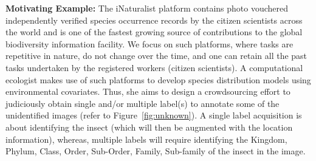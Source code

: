 

%
\begin{example}\label{ex1}
{\bf Motivating Example:} 
The iNaturalist platform contains photo vouchered independently verified species occurrence records by the citizen scientists across the world and is one of the fastest growing source of contributions to the global biodiversity information facility. We focus on such platforms, where tasks are repetitive in nature, do not change over the time, and one can retain all the past tasks undertaken by the registered workers (citizen scientists). A computational ecologist makes use of such platforms to develop species distribution models using environmental covariates. Thus, she aims to design a crowdsourcing effort to judiciously obtain single and/or multiple label(s) to annotate some of the unidentified images (refer to Figure~\ref{fig:unknown}). A single label acquisition is about identifying the insect (which will then be augmented with the location information), whereas, multiple labels will require identifying the Kingdom, Phylum, Class, Order, Sub-Order, Family, Sub-family of the insect in the image. 

%

%


\end{example}
